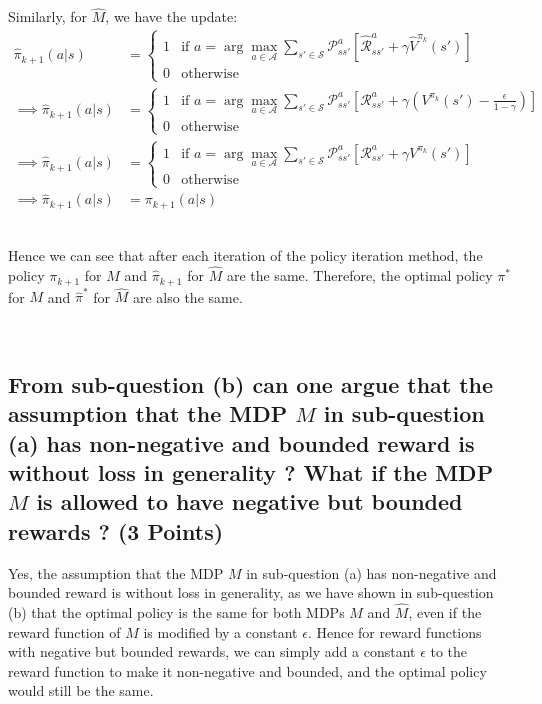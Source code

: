 \documentclass{article}
\renewcommand{\S}{\mathcal{S}}
\newcommand{\A}{\mathcal{A}}
\renewcommand{\P}{\mathcal{P}}
\newcommand{\R}{\mathcal{R}}
\newcommand{\Rhat}{\hat{\mathcal{R}}}
\begin{document}
\noindent
Similarly, for $\hat{M}$, we have the update:
\begin{align}
	\hat{\pi}_{k+1}(a|s) &= \begin{cases}
		1 & \text{if } a = \arg\max_{a \in \A} \sum_{s' \in \S} \P^a_{ss'} \left[ \Rhat^a_{ss'} + \gamma \hat{V}^{\pi_k}(s') \right] \\
		0 & \text{otherwise}
	\end{cases} \\
	\implies \hat{\pi}_{k+1}(a|s) &= \begin{cases}
		1 & \text{if } a = \arg\max_{a \in \A} \sum_{s' \in \S} \P^a_{ss'} \left[ \R^a_{ss'} + \gamma (V^{\pi_k}(s') - \frac{\epsilon}{1-\gamma}) \right] \\
		0 & \text{otherwise}
	\end{cases} \\
	\implies \hat{\pi}_{k+1}(a|s) &= \begin{cases}
		1 & \text{if } a = \arg\max_{a \in \A} \sum_{s' \in \S} \P^a_{ss'} \left[ \R^a_{ss'} + \gamma V^{\pi_k}(s') \right] \\
		0 & \text{otherwise}
	\end{cases} \\
	\implies \hat{\pi}_{k+1}(a|s) &= \pi_{k+1}(a|s)
\end{align}

\, \\
Hence we can see that after each iteration of the policy iteration method, the policy $\pi_{k+1}$ for $M$ and $\hat{\pi}_{k+1}$ for $\hat{M}$ are the same. Therefore, the optimal policy $\pi^*$ for $M$ and $\hat{\pi}^*$ for $\hat{M}$ are also the same.

\,

\subsection{From sub-question (b) can one argue that the assumption that the MDP $M$ in sub-question (a) has non-negative and bounded reward is without loss in generality ? What if the MDP $M$ is allowed to have negative but bounded rewards ? (3 Points)}

Yes, the assumption that the MDP $M$ in sub-question (a) has non-negative and bounded reward is without loss in generality, as we have shown in sub-question (b) that the optimal policy is the same for both MDPs $M$ and $\hat{M}$, even if the reward function of $M$ is modified by a constant $\epsilon$. Hence for reward functions with negative but bounded rewards, we can simply add a constant $\epsilon$ to the reward function to make it non-negative and bounded, and the optimal policy would still be the same.
\end{document}
